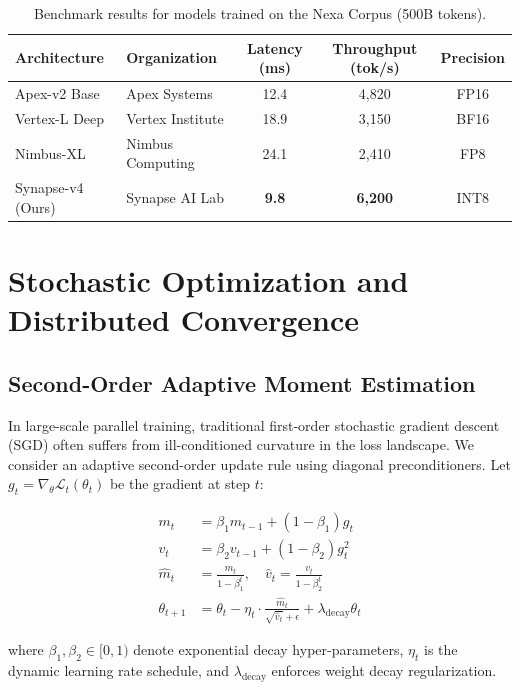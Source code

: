 \documentclass[
  11pt,
  a4paper,
  twoside=true,
  headsepline=0.8pt,
  footsepline=false,
  open=right,
  numbers=noenddot,
  chapterprefix=false,
  BCOR=6mm
]{scrbook}
\begin{document}
\begin{table}[htbp]
  \centering
  \caption{Benchmark results for models trained on the Nexa Corpus (500B tokens).}
  \label{tab:benchmarks}
  \vspace{4pt}
  \begin{tabularx}{\textwidth}{l X c c c}
    \toprule
    \textbf{Architecture} & \textbf{Organization} & \textbf{Latency (ms)} & \textbf{Throughput (tok/s)} & \textbf{Precision} \\
    \midrule
    Apex-v2 Base & Apex Systems & 12.4 & 4,820 & FP16 \\
    Vertex-L Deep & Vertex Institute & 18.9 & 3,150 & BF16 \\
    Nimbus-XL & Nimbus Computing & 24.1 & 2,410 & FP8 \\
    Synapse-v4 (Ours) & Synapse AI Lab & \textbf{9.8} & \textbf{6,200} & INT8 \\
    \bottomrule
  \end{tabularx}
\end{table}


\chapter{Stochastic Optimization and Distributed Convergence}

\section{Second-Order Adaptive Moment Estimation}

In large-scale parallel training, traditional first-order stochastic gradient descent (SGD) often suffers from ill-conditioned curvature in the loss landscape. We consider an adaptive second-order update rule using diagonal preconditioners. Let $g_t = \nabla_\theta \mathcal{L}_t(\theta_t)$ be the gradient at step $t$:

\begin{align}
  m_t &= \beta_1 m_{t-1} + (1 - \beta_1) g_t \\
  v_t &= \beta_2 v_{t-1} + (1 - \beta_2) g_t^2 \\
  \hat{m}_t &= \frac{m_t}{1 - \beta_1^t}, \quad \hat{v}_t = \frac{v_t}{1 - \beta_2^t} \\
  \theta_{t+1} &= \theta_t - \eta_t \cdot \frac{\hat{m}_t}{\sqrt{\hat{v}_t} + \epsilon} + \lambda_{\text{decay}} \theta_t
\end{align}

where $\beta_1, \beta_2 \in [0, 1)$ denote exponential decay hyper-parameters, $\eta_t$ is the dynamic learning rate schedule, and $\lambda_{\text{decay}}$ enforces weight decay regularization.
\end{document}
